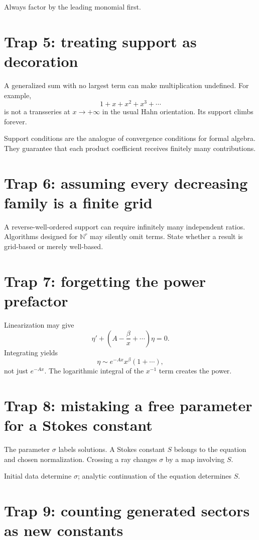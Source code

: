 \documentclass[11pt,openany]{book}
\theoremstyle{definition}
\theoremstyle{plain}
\theoremstyle{remark}
\newcommand{\N}{\mathbb{N}}
\newcommand{\asym}{\sim}
\begin{document}
Always factor by the leading monomial first.

\section{Trap 5: treating support as decoration}

A generalized sum with no largest term can make multiplication undefined. For example,
\[
 1+x+x^2+x^3+\cdots
\]
is not a transseries at $x\to+\infty$ in the usual Hahn orientation. Its support climbs forever.

Support conditions are the analogue of convergence conditions for formal algebra. They guarantee that each product coefficient receives finitely many contributions.

\section{Trap 6: assuming every decreasing family is a finite grid}

A reverse-well-ordered support can require infinitely many independent ratios. Algorithms designed for $\N^r$ may silently omit terms. State whether a result is grid-based or merely well-based.

\section{Trap 7: forgetting the power prefactor}

Linearization may give
\[
 \eta'+\left(A-\frac\beta x+\cdots\right)\eta=0.
\]
Integrating yields
\[
 \eta\asym e^{-Ax}x^\beta(1+\cdots),
\]
not just $e^{-Ax}$. The logarithmic integral of the $x^{-1}$ term creates the power.

\section{Trap 8: mistaking a free parameter for a Stokes constant}

The parameter $\sigma$ labels solutions. A Stokes constant $S$ belongs to the equation and chosen normalization. Crossing a ray changes $\sigma$ by a map involving $S$.

Initial data determine $\sigma$; analytic continuation of the equation determines $S$.

\section{Trap 9: counting generated sectors as new constants}
\end{document}
